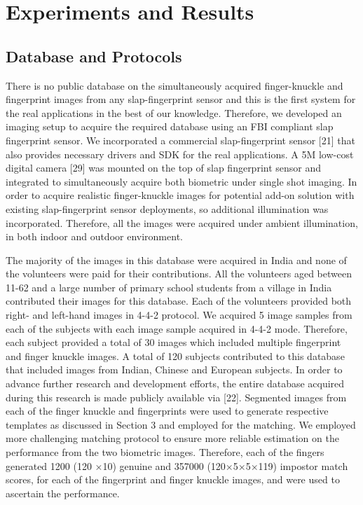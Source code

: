 \section{Experiments and Results}

\subsection{Database and Protocols}

There is no public database on the simultaneously acquired finger-knuckle and fingerprint images from any slap-fingerprint sensor and this is the first system for the real applications in the best of our knowledge. Therefore, we developed an imaging setup to acquire the required database using an FBI compliant slap fingerprint sensor. We incorporated a commercial slap-fingerprint sensor [21] that also provides necessary drivers and SDK for the real applications. A 5M low-cost digital camera [29] was mounted on the top of slap fingerprint sensor and integrated to simultaneously acquire both biometric under single shot imaging. In order to acquire realistic finger-knuckle images for potential add-on solution with existing slap-fingerprint sensor deployments, so additional illumination was incorporated. Therefore, all the images were acquired under ambient illumination, in both indoor and outdoor environment.

The majority of the images in this database were acquired in India and none of the volunteers were paid for their contributions. All the volunteers aged between 11-62 and a large number of primary school students from a village in India contributed their images for this database. Each of the volunteers provided both right- and left-hand images in 4-4-2 protocol. We acquired 5 image samples from each of the subjects with each image sample acquired in 4-4-2 mode. Therefore, each subject provided a total of 30 images which included multiple fingerprint and finger knuckle images. A total of 120 subjects contributed to this database that included images from Indian, Chinese and European subjects. In order to advance further research and development efforts, the entire database acquired during this research is made publicly available via [22]. Segmented images from each of the finger knuckle and fingerprints were used to generate respective templates as discussed in Section 3 and employed for the matching. We employed more challenging matching protocol to ensure more reliable estimation on the performance from the two biometric images. Therefore, each of the fingers generated 1200 (120 ×10) genuine and 357000 (120×5×5×119) impostor match scores, for each of the fingerprint and finger knuckle images, and were used to ascertain the performance.  